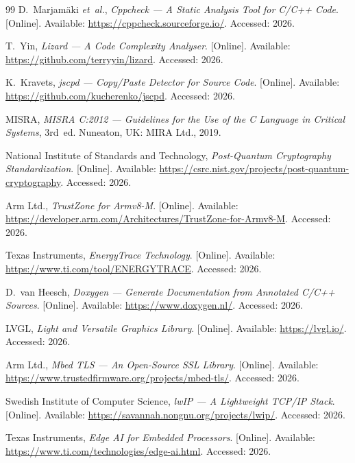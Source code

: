 \documentclass[12pt,a4paper,oneside]{book}
\begin{document}
\begin{thebibliography}{99}
D.~Marjam\"{a}ki \emph{et~al.}, \emph{Cppcheck --- A Static Analysis Tool for C/C++ Code}. [Online]. Available: \url{https://cppcheck.sourceforge.io/}. Accessed: 2026.

T.~Yin, \emph{Lizard --- A Code Complexity Analyser}. [Online]. Available: \url{https://github.com/terryyin/lizard}. Accessed: 2026.

K.~Kravets, \emph{jscpd --- Copy/Paste Detector for Source Code}. [Online]. Available: \url{https://github.com/kucherenko/jscpd}. Accessed: 2026.

MISRA, \emph{MISRA C:2012 --- Guidelines for the Use of the C Language in Critical Systems}, 3rd~ed. Nuneaton, UK: MIRA Ltd., 2019.

National Institute of Standards and Technology, \emph{Post-Quantum Cryptography Standardization}. [Online]. Available: \url{https://csrc.nist.gov/projects/post-quantum-cryptography}. Accessed: 2026.

Arm Ltd., \emph{TrustZone for Armv8-M}. [Online]. Available: \url{https://developer.arm.com/Architectures/TrustZone-for-Armv8-M}. Accessed: 2026.

Texas Instruments, \emph{EnergyTrace Technology}. [Online]. Available: \url{https://www.ti.com/tool/ENERGYTRACE}. Accessed: 2026.

D.~van Heesch, \emph{Doxygen --- Generate Documentation from Annotated C/C++ Sources}. [Online]. Available: \url{https://www.doxygen.nl/}. Accessed: 2026.

LVGL, \emph{Light and Versatile Graphics Library}. [Online]. Available: \url{https://lvgl.io/}. Accessed: 2026.

Arm Ltd., \emph{Mbed TLS --- An Open-Source SSL Library}. [Online]. Available: \url{https://www.trustedfirmware.org/projects/mbed-tls/}. Accessed: 2026.

Swedish Institute of Computer Science, \emph{lwIP --- A Lightweight TCP/IP Stack}. [Online]. Available: \url{https://savannah.nongnu.org/projects/lwip/}. Accessed: 2026.

Texas Instruments, \emph{Edge AI for Embedded Processors}. [Online]. Available: \url{https://www.ti.com/technologies/edge-ai.html}. Accessed: 2026.

\end{thebibliography}
\end{document}
